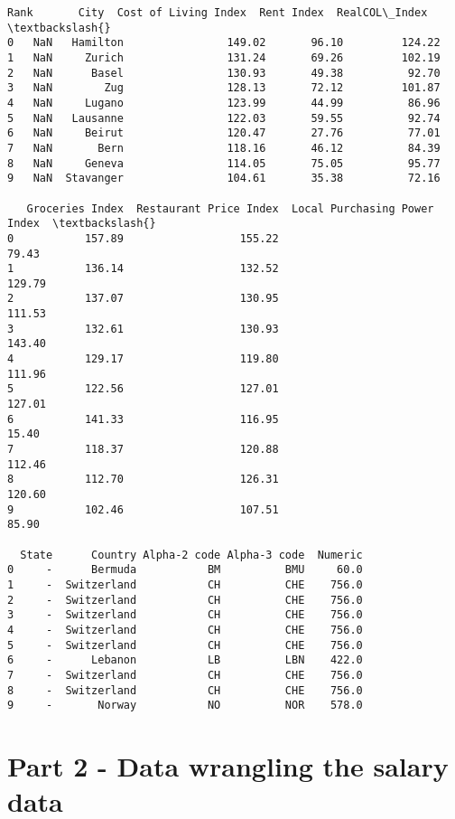 \documentclass[11pt]{article}
\begin{document}
    \begin{Verbatim}[commandchars=\\\{\}]
   Rank       City  Cost of Living Index  Rent Index  RealCOL\_Index  \textbackslash{}
0   NaN   Hamilton                149.02       96.10         124.22
1   NaN     Zurich                131.24       69.26         102.19
2   NaN      Basel                130.93       49.38          92.70
3   NaN        Zug                128.13       72.12         101.87
4   NaN     Lugano                123.99       44.99          86.96
5   NaN   Lausanne                122.03       59.55          92.74
6   NaN     Beirut                120.47       27.76          77.01
7   NaN       Bern                118.16       46.12          84.39
8   NaN     Geneva                114.05       75.05          95.77
9   NaN  Stavanger                104.61       35.38          72.16

   Groceries Index  Restaurant Price Index  Local Purchasing Power Index  \textbackslash{}
0           157.89                  155.22                         79.43
1           136.14                  132.52                        129.79
2           137.07                  130.95                        111.53
3           132.61                  130.93                        143.40
4           129.17                  119.80                        111.96
5           122.56                  127.01                        127.01
6           141.33                  116.95                         15.40
7           118.37                  120.88                        112.46
8           112.70                  126.31                        120.60
9           102.46                  107.51                         85.90

  State      Country Alpha-2 code Alpha-3 code  Numeric
0     -      Bermuda           BM          BMU     60.0
1     -  Switzerland           CH          CHE    756.0
2     -  Switzerland           CH          CHE    756.0
3     -  Switzerland           CH          CHE    756.0
4     -  Switzerland           CH          CHE    756.0
5     -  Switzerland           CH          CHE    756.0
6     -      Lebanon           LB          LBN    422.0
7     -  Switzerland           CH          CHE    756.0
8     -  Switzerland           CH          CHE    756.0
9     -       Norway           NO          NOR    578.0
    \end{Verbatim}

    \hypertarget{part-2---data-wrangling-the-salary-data}{%
\section{Part 2 - Data wrangling the salary
data}\label{part-2---data-wrangling-the-salary-data}}
\end{document}
